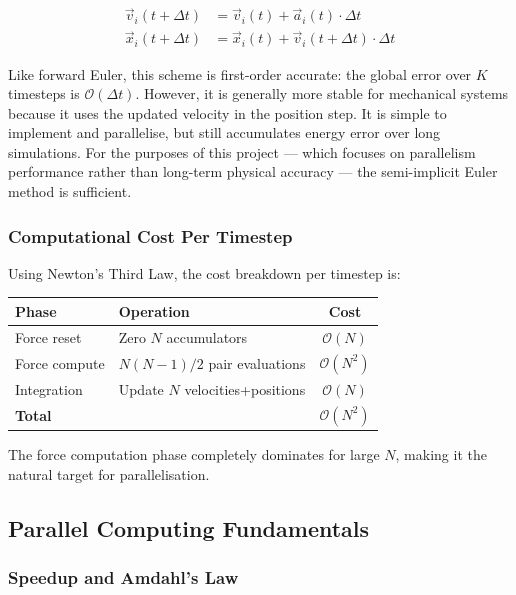 ﻿\documentclass[12pt,a4paper]{article}
\begin{document}
\begin{align}
    \vec{v}_i(t + \Delta t) &= \vec{v}_i(t) + \vec{a}_i(t) \cdot \Delta t \\
    \vec{x}_i(t + \Delta t) &= \vec{x}_i(t) + \vec{v}_i(t + \Delta t) \cdot \Delta t
\end{align}

Like forward Euler, this scheme is first-order accurate: the global error
over $K$ timesteps is $\mathcal{O}(\Delta t)$. However, it is generally more
stable for mechanical systems because it uses the updated velocity in the
position step. It is simple to implement and parallelise, but still
accumulates energy error over long simulations. For the purposes of this
project --- which focuses on parallelism performance rather than long-term
physical accuracy --- the semi-implicit Euler method is sufficient.

\subsubsection*{Computational Cost Per Timestep}

Using Newton's Third Law, the cost breakdown per timestep is:

\begin{center}
\begin{tabular}{llc}
    \toprule
    \textbf{Phase} & \textbf{Operation} & \textbf{Cost} \\
    \midrule
    Force reset     & Zero $N$ accumulators       & $\mathcal{O}(N)$ \\
    Force compute   & $N(N-1)/2$ pair evaluations & $\mathcal{O}(N^2)$ \\
    Integration     & Update $N$ velocities+positions & $\mathcal{O}(N)$ \\
    \midrule
    \textbf{Total}  &                             & $\mathcal{O}(N^2)$ \\
    \bottomrule
\end{tabular}
\end{center}

The force computation phase completely dominates for large $N$, making it
the natural target for parallelisation.

\subsection{Parallel Computing Fundamentals}

\subsubsection*{Speedup and Amdahl's Law}
\end{document}
